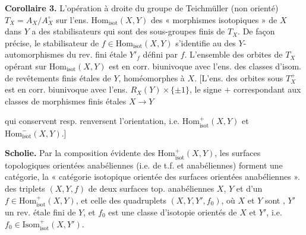 \documentclass[11pt,a4paper]{article}
\begin{document}
\textbf{Corollaire 3.}  L'opération à droite du groupe de Teichmüller (non orienté) $T_{X}=A_{X}/A^{\circ}_{X}$ sur l'ens. $\mathrm{Hom}_{\mathrm{isot}}(X,Y)$ des « morphismes isotopiques » de $X$ dans $Y$  a des stabilisateurs qui sont des sous-groupes finis de $T_{X}$. De façon précise, le stabilisateur de $f\in\mathrm{Hom}_{\mathrm{isot}}(X,Y)$ s'identifie au \struck{\ill{}}  \struck{\ill{}} des $Y$-automorphismes du rev. fini étale $Y'_{f}$ défini par $f$. L'ensemble des orbites de $T_{X}$ opérant sur $\mathrm{Hom}_{\mathrm{isot}}(X,Y)$ est en corr. biunivoque avec l'ens. \struck{\ill{}}  des classes d'isom. de revêtements finis étales de $Y$, homéomorphes à $X$. [L'ens. des orbites sous $T^{+}_{X}$ est en corr. biunivoque avec l'ens. $R_{X}(Y)\times\{\pm1\}$, le signe $+$ correspondant aux classes de morphismes finis étales $X\to Y$

qui conservent resp. renversent l'orientation, i.e. $\mathrm{Hom}^{+}_{\mathrm{isot}}(X,Y)$ et $\mathrm{Hom}^{-}_{\mathrm{isot}}(X,Y)$.]


\textbf{Scholie.} Par la composition évidente des $\mathrm{Hom}^{+}_{\mathrm{isot}}(X,Y)$, les surfaces topologiques orientées anabéliennes (i.e. de t.f. et anabéliennes) \struck{\ill{}} forment une catégorie, la « catégorie isotopique orientée des surfaces orientées anabéliennes ».   des triplets $(X,Y,f)$ de deux surfaces top. anabéliennes $X$, $Y$ et d'un $f\in\mathrm{Hom}^{+}_{\mathrm{isot}}(X,Y)$, et celle des quadruplets $(X,Y,Y',f_{0})$, où $X$ et $Y$ sont , $Y'$ un rev. étale fini de $Y$, et $f_{0}$ est une classe d'isotopie  orientés de $X$ et $Y'$, i.e. $f_{0}\in\mathrm{Isom}^{+}_{\mathrm{isot}}(X,Y')$.
\end{document}

